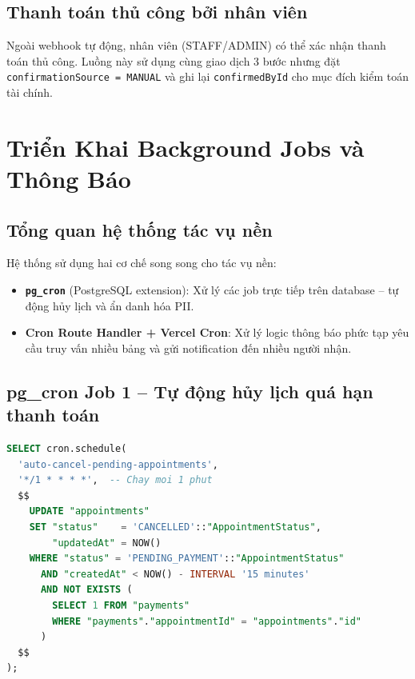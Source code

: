 \documentclass[14pt,a4paper]{report}
\begin{document}
\subsection{Thanh toán thủ công bởi nhân viên}

Ngoài webhook tự động, nhân viên (STAFF/ADMIN) có thể xác nhận
thanh toán thủ công. Luồng này sử dụng cùng giao dịch 3 bước nhưng
đặt \texttt{confirmationSource = MANUAL} và ghi lại
\texttt{confirmedById} cho mục đích kiểm toán tài chính.

\section{Triển Khai Background Jobs và Thông Báo}

\subsection{Tổng quan hệ thống tác vụ nền}

Hệ thống sử dụng hai cơ chế song song cho tác vụ nền:
\begin{itemize}
    \item \textbf{\texttt{pg\_cron}} (PostgreSQL extension): Xử lý
          các job trực tiếp trên database -- tự động hủy lịch và ẩn
          danh hóa PII.
    \item \textbf{Cron Route Handler + Vercel Cron}: Xử lý logic
          thông báo phức tạp yêu cầu truy vấn nhiều bảng và gửi
          notification đến nhiều người nhận.
\end{itemize}

\subsection{pg\_cron Job 1 -- Tự động hủy lịch quá hạn thanh toán}

\begin{lstlisting}[language=SQL, caption={pg\_cron: Tự động hủy lịch PENDING\_PAYMENT sau 15 phút}]
SELECT cron.schedule(
  'auto-cancel-pending-appointments',
  '*/1 * * * *',  -- Chay moi 1 phut
  $$
    UPDATE "appointments"
    SET "status"    = 'CANCELLED'::"AppointmentStatus",
        "updatedAt" = NOW()
    WHERE "status" = 'PENDING_PAYMENT'::"AppointmentStatus"
      AND "createdAt" < NOW() - INTERVAL '15 minutes'
      AND NOT EXISTS (
        SELECT 1 FROM "payments"
        WHERE "payments"."appointmentId" = "appointments"."id"
      )
  $$
);
\end{lstlisting}
\end{document}
